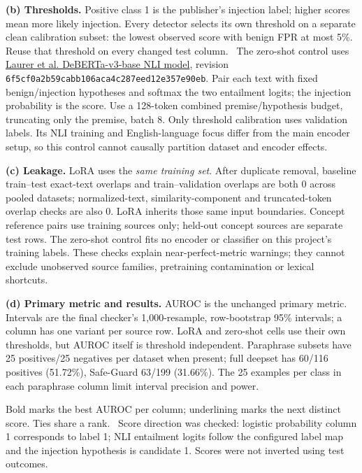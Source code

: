 \documentclass[10pt]{article}
\newcommand{\code}[1]{\nolinkurl{#1}}
\begin{document}
\textbf{(b) Thresholds.} Positive class 1 is the publisher's injection label; higher scores mean more likely injection. Every detector selects its own threshold on a separate clean calibration subset: the lowest observed score with benign FPR at most 5\%. Reuse that threshold on every changed test column. \ThresholdDescription\ The zero-shot control uses \href{https://huggingface.co/MoritzLaurer/DeBERTa-v3-base-mnli-fever-anli}{Laurer et al. DeBERTa-v3-base NLI model}, revision \code{6f5cf0a2b59cabb106aca4c287eed12e357e90eb}. Pair each text with fixed benign/injection hypotheses and softmax the two entailment logits; the injection probability is the score. Use a 128-token combined premise/hypothesis budget, truncating only the premise, batch 8. Only threshold calibration uses validation labels. Its NLI training and English-language focus differ from the main encoder setup, so this control cannot causally partition dataset and encoder effects.

\textbf{(c) Leakage.} LoRA uses the \emph{same training set}. After duplicate removal, baseline train--test exact-text overlaps and train--validation overlaps are both 0 across pooled datasets; normalized-text, similarity-component and truncated-token overlap checks are also 0. LoRA inherits those same input boundaries. Concept reference pairs use training sources only; held-out concept sources are separate test rows. The zero-shot control fits no encoder or classifier on this project's training labels. These checks explain near-perfect-metric warnings; they cannot exclude unobserved source families, pretraining contamination or lexical shortcuts.

\newpage
\textbf{(d) Primary metric and results.} AUROC is the unchanged primary metric. Intervals are the final checker's 1,000-resample, row-bootstrap 95\% intervals; a column has one variant per source row. LoRA and zero-shot cells use their own thresholds, but AUROC itself is threshold independent. Paraphrase subsets have 25 positives/25 negatives per dataset when present; full deepset has 60/116 positives (51.72\%), Safe-Guard 63/199 (31.66\%). The 25 examples per class in each paraphrase column limit interval precision and power.
\begin{center}\resizebox{\linewidth}{!}{}\end{center}
Bold marks the best AUROC per column; underlining marks the next distinct score. Ties share a rank.
\RandomReferenceDescription\ Score direction was checked: logistic probability column 1 corresponds to label 1; NLI entailment logits follow the configured label map and the injection hypothesis is candidate 1. Scores were not inverted using test outcomes. \FrozenParaphraseFinding
\end{document}
